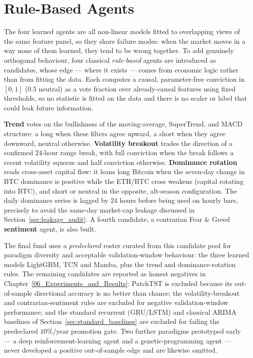 \section{Rule-Based Agents}
\label{sec:rule_agents}

The four learned agents are all non-linear models fitted to overlapping views of the same feature panel, so they share failure modes: when the market moves in a way none of them learned, they tend to be wrong together. To add genuinely orthogonal behaviour, four classical \textit{rule-based} agents are introduced as candidates, whose edge --- where it exists --- comes from economic logic rather than from fitting the data. Each computes a causal, parameter-free conviction in $[0,1]$ ($0.5$ neutral) as a vote fraction over already-causal features using fixed thresholds, so no statistic is fitted on the data and there is no scaler or label that could leak future information.


\textbf{Trend} votes on the bullishness of the moving-average, SuperTrend, and MACD structure: a long when these filters agree upward, a short when they agree downward, neutral otherwise. \textbf{Volatility breakout} trades the direction of a confirmed 24-hour range break, with full conviction when the break follows a recent volatility squeeze and half conviction otherwise. \textbf{Dominance rotation} reads cross-asset capital flow: it leans long Bitcoin when the seven-day change in BTC dominance is positive while the ETH/BTC cross weakens (capital rotating into BTC), and short or neutral in the opposite, alt-season configuration. The daily dominance series is lagged by 24 hours before being used on hourly bars, precisely to avoid the same-day market-cap leakage discussed in Section~\ref{sec:leakage_audit}. A fourth candidate, a contrarian Fear \& Greed \textbf{sentiment} agent, is also built.


The final fund uses a \textit{predeclared} roster curated from this candidate pool for paradigm diversity and acceptable validation-window behaviour: the three learned models LightGBM, TCN and Mamba, plus the trend and dominance-rotation rules. The remaining candidates are reported as honest negatives in Chapter~\ref{06_Experiments_and_Results}: PatchTST is excluded because its out-of-sample directional accuracy is no better than chance; the volatility-breakout and contrarian-sentiment rules are excluded for negative validation-window performance; and the standard recurrent (GRU/LSTM) and classical ARIMA baselines of Section~\ref{sec:standard_baselines} are excluded for failing the predeclared $10\%$/year promotion gate. Two further paradigms prototyped early --- a deep reinforcement-learning agent and a genetic-programming agent --- never developed a positive out-of-sample edge and are likewise omitted.



